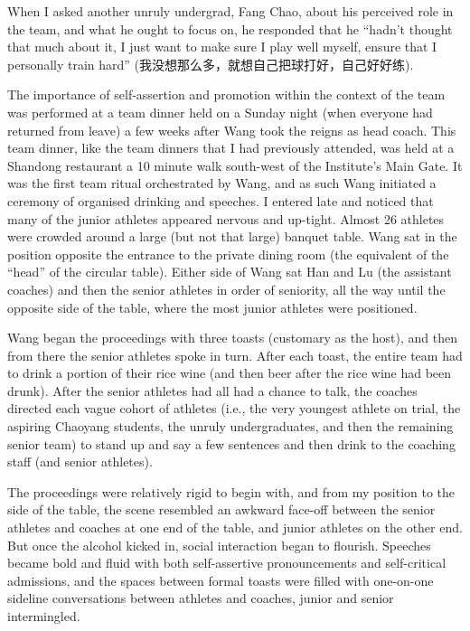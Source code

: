 \begin{CJK}{UTF8}{gbsn}
When I asked another unruly undergrad, Fang Chao, about his perceived role in the team, and what he ought to focus on, he responded that he ``hadn't thought that much about it, I just want to make sure I play well myself, ensure that I personally train hard'' (我没想那么多，就想自己把球打好，自己好好练).

The importance of self-assertion and promotion within the context of the team was performed at a team dinner held on a Sunday night (when everyone had returned from leave) a few weeks after Wang took the reigns as head coach.  This team dinner, like the team dinners that I had previously attended, was held at a Shandong restaurant a 10 minute walk south-west of the Institute's Main Gate.  It was the first team ritual orchestrated by Wang, and as such Wang initiated a ceremony of organised drinking and speeches.  I entered late and noticed that many of the junior athletes appeared nervous and up-tight. Almost 26 athletes were crowded around a large (but not that large) banquet table.  Wang sat in the position opposite the entrance to the private dining room (the equivalent of the ``head'' of the circular table).  Either side of Wang sat Han and Lu (the assistant coaches) and then the senior athletes in order of seniority, all the way until the opposite side of the table, where the most junior athletes were positioned.

Wang began the proceedings with three toasts (customary as the host), and then from there the senior athletes spoke in turn.  After each toast, the entire team had to drink a portion of their rice wine (and then beer after the rice wine had been drunk).  After the senior athletes had all had a chance to talk, the coaches directed each vague cohort of athletes (i.e., the very youngest athlete on trial, the aspiring Chaoyang students, the unruly undergraduates, and then the remaining senior team) to stand up and say a few sentences and then drink to the coaching staff (and senior athletes).

The proceedings were relatively rigid to begin with, and from my position to the side of the table, the scene resembled an awkward face-off between the senior athletes and coaches at one end of the table, and junior athletes on the other end.  But once the alcohol kicked in, social interaction began to flourish. Speeches became bold and fluid with both self-assertive pronouncements and self-critical admissions, and the spaces between formal toasts were filled with one-on-one sideline conversations between athletes and coaches, junior and senior intermingled.


\end{CJK}
